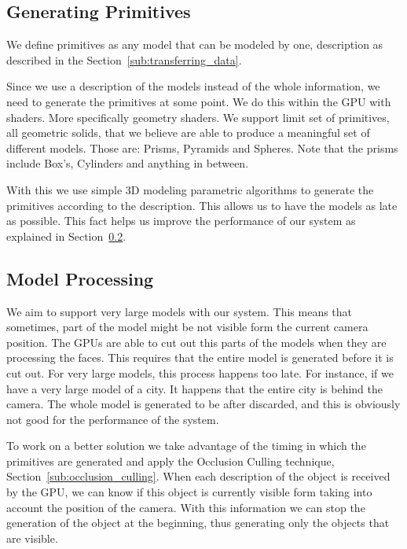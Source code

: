 
\subsection{Generating Primitives} %
\label{sub:generating_primitives}

We define primitives as any model that can be modeled by one, description as described in the Section~\ref{sub:transferring_data}.

Since we use a description of the models instead of the whole information, we need to generate the primitives at some point. We do this within the GPU with shaders. More specifically geometry shaders. We support limit set of primitives, all geometric solids, that we believe are able to produce a meaningful set of different models.
Those are: Prisms, Pyramids and Spheres. Note that the prisms include Box's, Cylinders and anything in between.

With this we use simple 3D modeling parametric algorithms to generate the primitives according to the description. This allows us to have the models as late as possible. This fact helps us improve the performance of our system as explained in Section~\ref{sub:size}.


\subsection{Model Processing} %
\label{sub:size}

We aim to support very large models with our system. This means that sometimes, part of the model might be not visible form the current camera position. The \glspl{GPU} are able to cut out this parts of the models when they are processing the faces. This requires that the entire model is generated before it is cut out. For very large models, this process happens too late. For instance, if we have a very large model of a city. It happens that the entire city is behind the camera. The whole model is generated to be after discarded, and this is obviously not good for the performance of the system.

To work on a better solution we take advantage of the timing in which the primitives are generated and apply the Occlusion Culling technique, Section~\ref{sub:occlusion_culling}. When each description of the object is received by the \gls{GPU}, we can know if this object is currently visible form taking into account the position of the camera. With this information we can stop the generation of the object at the beginning, thus generating only the objects that are visible.

